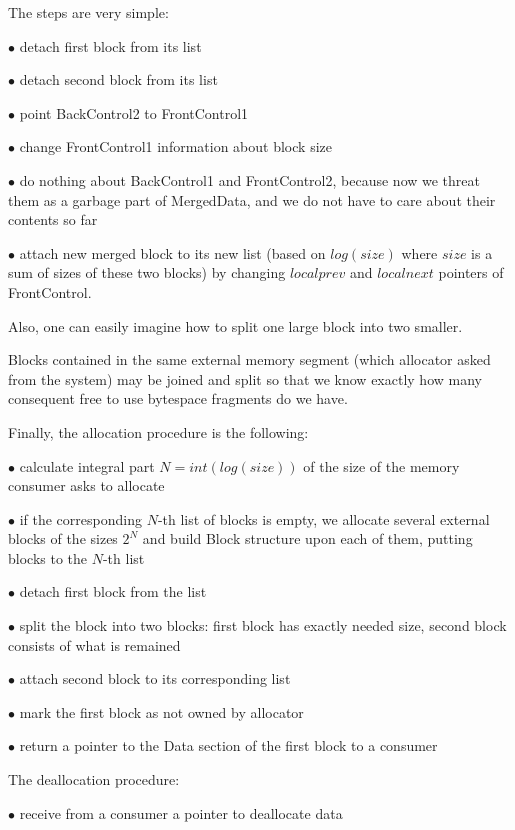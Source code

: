 \documentclass{article}
\begin{document}
The steps are very simple:

$\bullet$ detach first block from its list

$\bullet$ detach second block from its list

$\bullet$ point BackControl2 to FrontControl1

$\bullet$ change FrontControl1 information about block size

$\bullet$ do nothing about BackControl1 and FrontControl2, because now we threat them as a garbage part of MergedData, and we do not have to care about their contents so far

$\bullet$ attach new merged block to its new list (based on $log(size)$ where $size$ is a sum of sizes of these two blocks) by changing $localprev$ and $localnext$ pointers of FrontControl.

\smallskip

Also, one can easily imagine how to split one large block into two smaller.

\smallskip

Blocks contained in the same external memory segment (which allocator asked from the system) may be joined and split so that we know exactly how many consequent free to use bytespace fragments do we have.
\smallskip

Finally, the allocation procedure is the following:

$\bullet$ calculate integral part $N = int(log(size))$ of the size of the memory consumer asks to allocate

$\bullet$ if the corresponding $N$-th list of blocks is empty, we allocate several external blocks of the sizes $2^{N}$ and build Block structure upon each of them, putting blocks to the $N$-th list

$\bullet$ detach first block from the list

$\bullet$ split the block into two blocks: first block has exactly needed size, second block consists of what is remained

$\bullet$ attach second block to its corresponding list

$\bullet$ mark the first block as not owned by allocator

$\bullet$ return a pointer to the Data section of the first block to a consumer

\smallskip

The deallocation procedure:

$\bullet$ receive from a consumer a pointer to deallocate data
\end{document}
